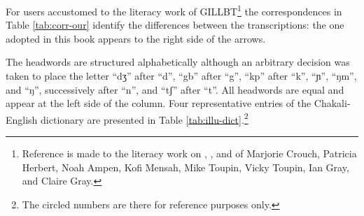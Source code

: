 \newpage 
For users accustomed to the literacy work of GILLBT\footnote{Reference is made to the literacy work on ,  , and   of Marjorie Crouch, Patricia Herbert, Noah Ampen, Kofi Mensah, Mike Toupin, Vicky Toupin, Ian Gray,  and Claire Gray.} the correspondences in Table \ref{tab:corr-our} identify the differences between the transcriptions: the one adopted in this book appears to the right side of the arrows. 

\begin{table} 
\caption[]{Correspondences of orthographies\label{tab:corr-our}}
 \begin{center}
\end{center}
\end{table}



The  headwords  are structured alphabetically  although an arbitrary decision was taken to place the letter ``{dʒ}'' after ``{d}'', ``{gb}'' after ``{g}'', ``{kp}'' after ``{k}'',  ``{ɲ}'',  ``{ŋm}'', and ``{ŋ}'',  successively after ``{n}'',  and ``{tʃ}'' after ``{t}''.  All headwords are equal and appear at the left side of the column. Four representative entries of the Chakali-English dictionary are presented in Table \ref{tab:illu-dict}.\footnote{The circled numbers are there for reference purposes only.}

